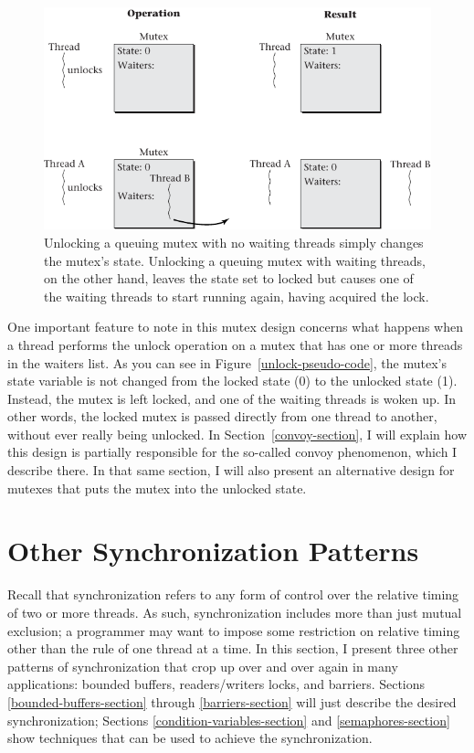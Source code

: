\begin{figure}
\centerline{\includegraphics{hail_f0413}}
\caption{Unlocking a queuing mutex with no waiting threads simply
  changes the mutex's state.  Unlocking a queuing mutex with waiting
  threads, on the other hand, leaves the state set to locked but
  causes one of the waiting threads to start running again, having
  acquired the lock.}
\label{scan-4-6}
\end{figure}
One important feature to note in this mutex design concerns what
happens when a thread performs the unlock operation on a mutex that has one or more threads in the
waiters list.  As you can see in Figure~\ref{unlock-pseudo-code}, the
mutex's state variable is not changed from the locked state (0) to the
unlocked state (1).  Instead, the mutex is left locked, and one of the
waiting threads is woken up.  In other words, the locked mutex is
passed directly from one thread to another, without ever really being
unlocked.  In Section~\ref{convoy-section}, I will explain how this
design is partially responsible for the so-called convoy
phenomenon, which I describe there.  In that same section, I will also present an
alternative design for mutexes that puts the mutex into the unlocked
state.

\section{Other Synchronization Patterns}\label{other-synchronization-problems-section}

Recall that synchronization refers to any form of control over the
relative timing of two or more threads.  As such, synchronization
includes more than just mutual exclusion; a programmer may want to impose some
restriction on relative timing other than the rule of one thread at a
time.  In this section, I present three other patterns of
synchronization that crop up over and over again in many applications:
bounded buffers, readers/writers locks, and barriers.
Sections \ref{bounded-buffers-section} through 
\ref{barriers-section} will just describe the desired synchronization;
Sections \ref{condition-variables-section} and \ref{semaphores-section} show techniques that can be used to achieve the
synchronization.

